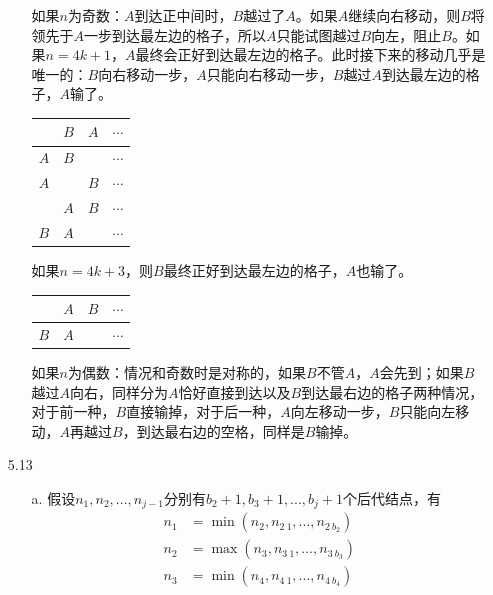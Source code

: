 \documentclass[UTF8,zihao=-4]{ctexart}
\begin{document}
\begin{itemize}
\begin{enumerate}
            如果$n$为奇数：$A$到达正中间时，$B$越过了$A$。如果$A$继续向右移动，则$B$将领先于$A$一步到达最左边的格子，所以$A$只能试图越过$B$向左，阻止$B$。如果$n=4k+1$，$A$最终会正好到达最左边的格子。此时接下来的移动几乎是唯一的：$B$向右移动一步，$A$只能向右移动一步，$B$越过$A$到达最左边的格子，$A$输了。
            \begin{center}
                \begin{tabular}{|c|c|c|c}
                    \hline
                    & $B$ & $A$ & $\cdots$ \\ \hline
                    $A$ & $B$ & & $\cdots$ \\ \hline
                    $A$ & & $B$ & $\cdots$ \\ \hline
                    & $A$ & $B$ & $\cdots$ \\ \hline
                    $B$ & $A$ & & $\cdots$ \\ \hline
                \end{tabular}
            \end{center}
            如果$n=4k+3$，则$B$最终正好到达最左边的格子，$A$也输了。
            \begin{center}
                \begin{tabular}{|c|c|c|c}
                    \hline
                    & $A$ & $B$ & $\cdots$ \\ \hline
                    $B$ & $A$ & & $\cdots$ \\ \hline
                \end{tabular}
            \end{center}
            如果$n$为偶数：情况和奇数时是对称的，如果$B$不管$A$，$A$会先到；如果$B$越过$A$向右，同样分为$A$恰好直接到达以及$B$到达最右边的格子两种情况，对于前一种，$B$直接输掉，对于后一种，$A$向左移动一步，$B$只能向左移动，$A$再越过$B$，到达最右边的空格，同样是$B$输掉。
        \end{enumerate} 
        \item[5.13]
        \begin{enumerate}
            \item[a.] 假设$n_1,n_2,...,n_{j-1}$分别有$b_2+1,b_3+1,...,b_j+1$个后代结点，有
            \begin{align*}
                n_1&=\min(n_2,n_{2\ 1},...,n_{2\ b_2}) \\
                n_2&=\max(n_3,n_{3\ 1},...,n_{3\ b_3}) \\
                n_3&=\min(n_4,n_{4\ 1},...,n_{4\ b_4}) \\

\end{align*}
\end{enumerate}
\end{itemize}
\end{document}
